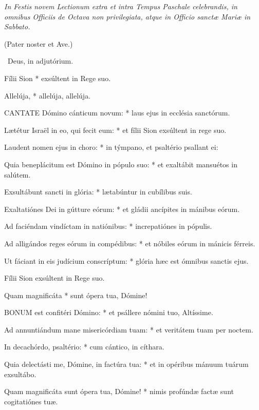 
\textit{In Festis novem Lectionum extra et intra Tempus Paschale celebrandis, in omnibus Officiis de Octava non privilegiata, atque in Officio sanctæ Mariæ in Sabbato.}

(Pater noster et Ave.)

\V\ Deus, in adjutórium.


 Fílii Sion * exsúltent in Rege suo.


 Allelúja, * allelúja, allelúja.


\lettrine[lines=2]{C}{ANTATE} Dómino cánticum novum: * laus ejus in ecclésia sanctórum.

Lætétur Israël in eo, qui fecit eum: * et fílii Sion exsúltent in rege suo.

Laudent nomen ejus in choro: * in týmpano, et psaltério psallant ei:

Quia beneplácitum est Dómino in pópulo suo: * et exaltábit mansuétos in salútem.

Exsultábunt sancti in glória: * lætabúntur in cubílibus suis.

Exaltatiónes Dei in gútture eórum: * et gládii ancípites in mánibus eórum.

Ad faciéndam vindíctam in natiónibus: * increpatiónes in pópulis.

Ad alligándos reges eórum in compédibus: * et nóbiles eórum in mánicis férreis.

Ut fáciant in eis judícium conscríptum: * glória hæc est ómnibus sanctis ejus.

 Fílii Sion exsúltent in Rege suo.

 Quam magnificáta * sunt ópera tua, Dómine!


\lettrine[lines=2]{B}{ONUM} est confitéri Dómino: * et psállere nómini tuo, Altíssime.

Ad annuntiándum mane misericórdiam tuam: * et veritátem tuam per noctem.

In decachórdo, psaltério: * cum cántico, in cíthara.

Quia delectásti me, Dómine, in factúra tua: * et in opéribus mánuum tuárum exsultábo.

Quam magnificáta sunt ópera tua, Dómine! * nimis profúndæ factæ sunt cogitatiónes tuæ.

